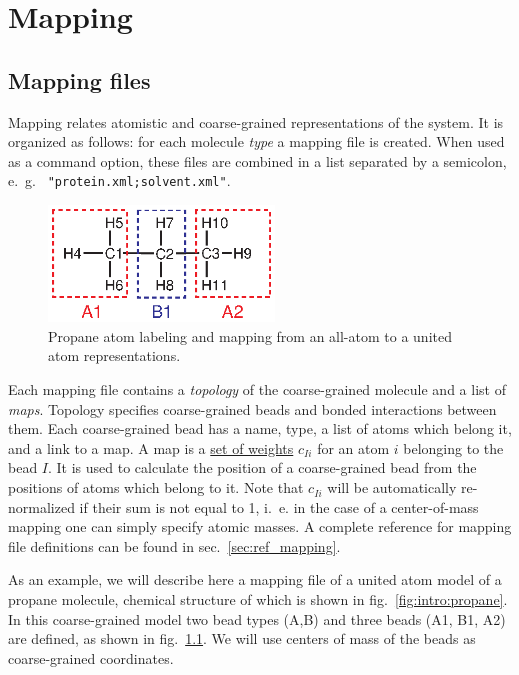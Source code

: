 \chapter{Mapping}
\label{sec:mapping}

\section{Mapping files}

Mapping relates atomistic and coarse-grained representations of the system. It is organized as follows: for each molecule {\em type} a mapping file is created. When used as a command option, these files are combined in a list separated by a semicolon, e.~g. ~\texttt{"protein.xml;solvent.xml"}.

\begin{figure}
  \includegraphics[width=6cm]{usage/fig/propane.eps}
  \caption{Propane atom labeling and mapping from an all-atom to a united atom representations.
  \label{fig:propane_map}
}
\end{figure}

Each mapping file contains a {\em topology} of the coarse-grained molecule and a list of {\em maps}. Topology specifies coarse-grained beads and bonded interactions between them. Each coarse-grained bead has a name, type, a list of atoms which belong it, and a link to a map. A map is a \hyperref[sec:mapping_operator]{set of weights} $c_{Ii}$ for an atom $i$ belonging to the bead $I$. It is used to calculate the position of a coarse-grained bead from the positions of atoms which belong to it. Note that $c_{Ii}$ will be automatically re-normalized if their sum is not equal to 1, i.~e. in the case of a center-of-mass mapping one can simply specify atomic masses.
A complete reference for mapping file definitions can be found in sec.~\ref{sec:ref_mapping}.

As an example, we will describe here a mapping file of a united atom model of a propane molecule, chemical structure of which is shown in fig.~\ref{fig:intro:propane}. In this coarse-grained model two bead types (A,B) and three beads (A1, B1, A2) are defined, as shown in fig.~\ref{fig:propane_map}. We will use centers of mass of the beads as  coarse-grained coordinates.

